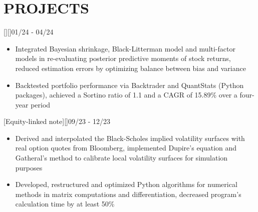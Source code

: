 \documentclass[cmu]{resume}
\begin{document}
    \section{PROJECTS}
    [][]{01/24 - 04/24}
    \begin{itemize}
        \item Integrated Bayesian shrinkage, Black-Litterman model and multi-factor models in re-evaluating posterior predictive moments of stock returns, reduced estimation errors by optimizing balance between bias and variance
        \item Backtested portfolio performance via Backtrader and QuantStats (Python packages), achieved a Sortino ratio of 1.1 and a CAGR of 15.89\% over a four-year period
    \end{itemize}

    [Equity-linked note][]{09/23 - 12/23}
    \begin{itemize}
        \item Derived and interpolated the Black-Scholes implied volatility surfaces with real option quotes from Bloomberg, implemented Dupire's equation and Gatheral's method to calibrate local volatility surfaces for simulation purposes
        \item Developed, restructured and optimized Python algorithms for numerical methods in matrix computations and differentiation, decreased program's calculation time by at least 50\%
    \end{itemize}

\end{document}
